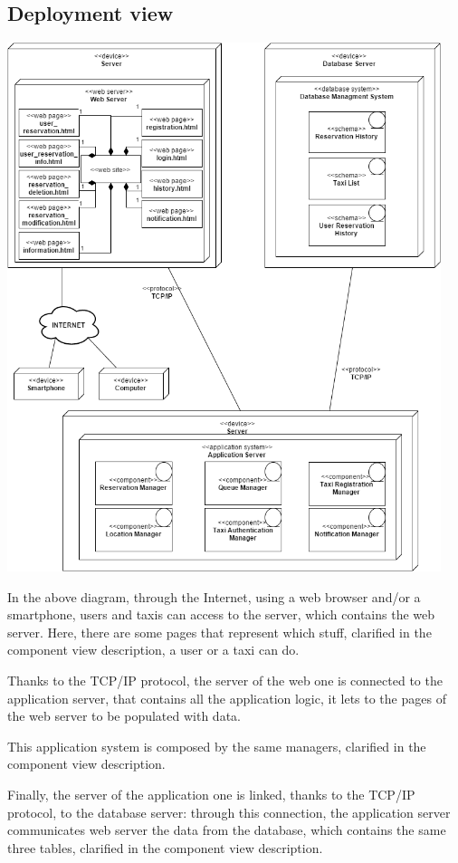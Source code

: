 \subsection{Deployment view}
	\begin{center}
		\includegraphics[width=0.95\textwidth]{./images/deployment_view.png}
	\end{center}
	
	In the above diagram, through the Internet, using a web browser and/or a smartphone, users and taxis can access to the server, which contains the web server. Here, there are some pages that represent which stuff, clarified in the component view description, a user or a taxi can do.
	
	Thanks to the TCP/IP protocol, the server of the web one is connected to the application server, that contains all the application logic, it lets to the pages of the web server to be populated with data.
	
	This application system is composed by the same managers, clarified in the component view description.
	
	Finally, the server of the application one is linked, thanks to the TCP/IP protocol, to the database server: through this connection, the application server communicates web server the data from the database, which contains the same three tables, clarified in the component view description. 


